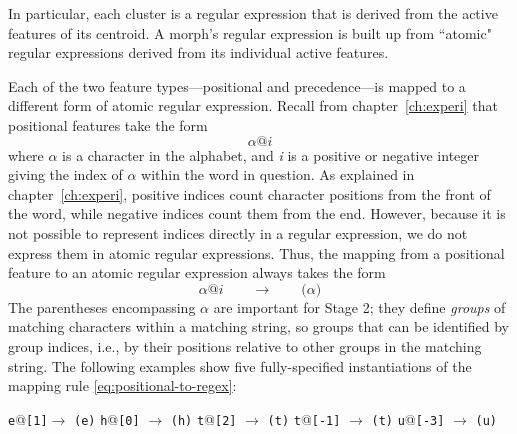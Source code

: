 In particular, each 
cluster is a regular expression that is derived from the active 
features of its centroid. A morph's regular expression is built 
up from ``atomic" regular expressions derived from its 
individual active features. 

Each of the two feature types---positional and precedence---is mapped to a different form of
atomic regular expression. Recall from chapter~\ref{ch:experi} that positional features take 
the form
\begin{equation*}
\alpha\text{@}i
\end{equation*}
where $\alpha$ is a character in the alphabet, and \textit{i} is a positive or negative integer 
giving the index of $\alpha$ within the word in question. As explained in chapter~\ref{ch:experi}, 
positive indices count character positions from the front of the word, while negative indices 
count them from the end. However, because it is not possible to represent indices directly in a regular
expression, we do not express them in atomic regular 
expressions. %
Thus, the mapping from a positional feature to an atomic regular expression always takes the form
\begin{equation} \label{eq:positional-to-regex}
\alpha\text{@}i \qquad \to \qquad \texttt{(}\alpha\texttt{)}
\end{equation}
The parentheses encompassing $\alpha$ are important for Stage 2; they define 
\emph{groups} of matching characters within a matching
string, so groups that can be identified by group indices, i.e., by their positions relative to other groups
in the matching string.
The following examples show five fully-specified instantiations of the mapping rule \eqref{eq:positional-to-regex}:
\begin{exe}
\ex \label{ex:positional-morphs}
\begin{xlist}
	\ex \texttt{e}\textrm{@}\texttt{[1]}\qquad  $\to$ \qquad    \texttt{(e)}
	\ex \texttt{h}\textrm{@}\texttt{[0]}  \qquad $\to$ \qquad     \texttt{(h)}
	\ex \texttt{t}\textrm{@}\texttt{[2]}   \qquad  $\to$   \qquad       \texttt{(t)}
	\ex \texttt{t}@\texttt{[-1]} \qquad  $\to$   \qquad  \texttt{(t)}
	\ex \texttt{u}\textrm{@}\texttt{[-3]} \qquad  $\to$   \qquad  \texttt{(u)}
\end{xlist}
\end{exe}

